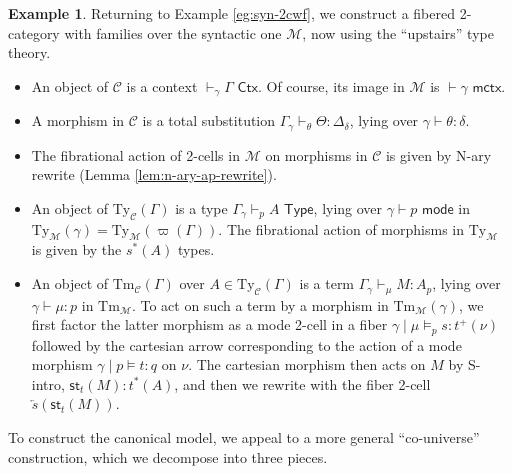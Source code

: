\documentclass[10pt]{article}
\theoremstyle{definition}
\newtheorem{example}{Example}
\newcommand{\yields}{\vdash}
\newcommand{\CTX}{\,\,\mathsf{Ctx}}
\newcommand{\ctx}{\,\,\mathsf{mctx}}
\newcommand{\TYPE}{\,\,\mathsf{Type}}
\newcommand{\type}{\,\,\mathsf{mode}}
\newcommand{\rewrite}[2]{\overleftarrow{#1}(#2)}
\newcommand\St[2]{\ensuremath{{#1}^*(#2)}}
\newcommand\StI[2]{\ensuremath{\mathsf{st}_{#1}(#2)}}
\newcommand\TypeTwo[4]{\ensuremath{#1 \mid #3 \vDash #2 : #4}}
\newcommand\TermTwoT[5]{\ensuremath{#1 \mid #3 \vDash_{#5} #2 : #4}}
\newcommand\TrPlus[2]{\ensuremath{{#1}^+(#2)}}
\newcommand\M{\mathcal{M}}
\newcommand\Mty{{\mathrm{Ty}_{\M}}}
\newcommand\Mtm{{\mathrm{Tm}_{\M}}}
\newcommand\C{\mathcal{C}}
\newcommand\Cty{\mathrm{Ty}_{\C}}
\newcommand\Ctm{\mathrm{Tm}_{\C}}
\newcommand\vp{\varpi}
\begin{document}
\begin{example}\label{eg:syn-fib-2cwf}
  Returning to Example \ref{eg:syn-2cwf}, we construct a fibered 2-category with families over the syntactic one $\M$, now using the ``upstairs'' type theory.
  \begin{itemize}
  \item An object of $\C$ is a context $\yields_\gamma \Gamma \CTX$.
    Of course, its image in $\M$ is $\yields \gamma \ctx$.
  \item A morphism in $\C$ is a total substitution $\Gamma_{\gamma} \yields_\theta \Theta : \Delta_\delta$, lying over $\gamma \yields \theta : \delta$.
  \item The fibrational action of 2-cells in $\M$ on morphisms in $\C$ is given by N-ary rewrite (Lemma \ref{lem:n-ary-ap-rewrite}).
  \item An object of $\Cty(\Gamma)$ is a type $\Gamma_\gamma \yields_p A \TYPE$, lying over $\gamma \yields p\type$ in $\Mty(\gamma) = \Mty(\vp(\Gamma))$.
    The fibrational action of morphisms in $\Mty$ is given by the $\St{s}{A}$ types.
  \item An object of $\Ctm(\Gamma)$ over $A\in \Cty(\Gamma)$ is a term $\Gamma_\gamma \yields_\mu M:A_p$, lying over $\gamma \yields \mu:p$ in $\Mtm$.
    To act on such a term by a morphism in $\Mtm(\gamma)$, we first factor the latter morphism as a mode 2-cell in a fiber $\TermTwoT{\gamma}{s}{\mu}{\TrPlus{t}{\nu}}{p}$ followed by the cartesian arrow corresponding to the action of a mode morphism $\TypeTwo{\gamma}{t}{p}{q}$ on $\nu$.
    The cartesian morphism then acts on $M$ by S-intro, $\StI{t}{M} : \St{t}{A}$, and then we rewrite with the fiber 2-cell $\rewrite{s}{\StI{t}{M}}$.
  \end{itemize}
\end{example}

To construct the canonical model, we appeal to a more general ``co-universe'' construction, which we decompose into three pieces.
\end{document}
